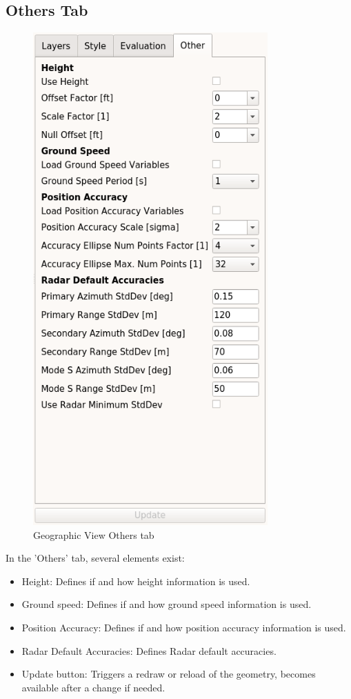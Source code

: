 \subsection{Others Tab}

\begin{figure}[H]
   \center
    \includegraphics[width=9cm,frame]{figures/geoview_others_tab.png}
  \caption{Geographic View Others tab}
\end{figure}

In the 'Others' tab, several elements exist:

\begin{itemize}
 \item Height: Defines if and how height information is used.
 \item Ground speed: Defines if and how ground speed information is used.
 \item Position Accuracy: Defines if and how position accuracy information is used.
 \item Radar Default Accuracies: Defines Radar default accuracies.
 \item Update button: Triggers a redraw or reload of the geometry, becomes available after a change if needed.
\end{itemize} 

